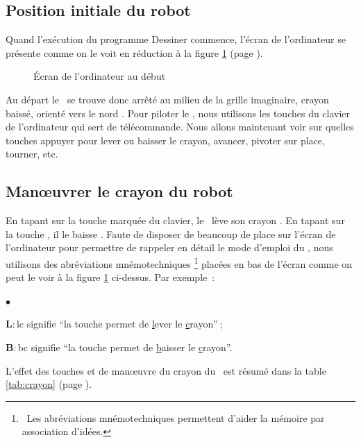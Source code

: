\subsection{Position initiale du robot}

Quand l'exécution du programme {\idt Des\-si\-ner}
commence, l'écran 
de l'ordinateur se présente comme on le voit en réduction à la figure 
\ref{fig:ecran-initial-1}  (page \pageref{fig:ecran-initial-1}).
\begin{figure}[htbp]
 \caption{Écran de l'ordinateur au début}
 \label{fig:ecran-initial-1}
\end{figure}
Au départ le \robot\ se trouve donc arrêté au milieu de la grille
imaginaire, crayon baissé, or\-ienté vers le nord \robotCbN\/.
Pour piloter le \robot, nous utilisons les touches du clavier de 
l'ordinateur qui sert de télécommande. Nous allons maintenant
voir sur quelles touches appuyer pour lever ou baisser le crayon, 
avancer, pivoter sur place, tourner, etc.

\subsection{Manœuvrer le crayon du robot}

 En tapant sur la touche marquée  du
clavier, le \robot\ lève son crayon \robotClN\/. En tapant sur la touche 
, il le baisse \robotCbN\/. Faute de disposer de beaucoup de place sur l'écran 
de l'ordinateur pour
permettre de rappeler en détail le mode d'emploi du \robot, nous utilisons
des abréviations mnémotechniques%
%
\footnote{\ Les abréviations mnémotechniques permettent d'aider la mémoire par association d'idées.}
placées en bas de l'écran comme on peut
le voir à la figure 
\ref{fig:ecran-initial-1} ci-dessus. 
Par \hbox{exemple~:}
\begin{list}{$\scriptscriptstyle\bullet$}{
}
\item {\bf L}$:${\idt lc} signifie ``la touche  permet de {\underline l}ever le \hbox{{\underline c}rayon''$\:$;}
\item {\bf B}$:${\idt bc} signifie ``la touche  permet de {\underline b}aisser le \hbox{{\underline c}rayon''.}
\end{list}

L'effet des touches  et  de manœuvre du crayon du 
\robot\ est résumé dans la table \ref{tab:crayon} (page \pageref{tab:crayon}).

